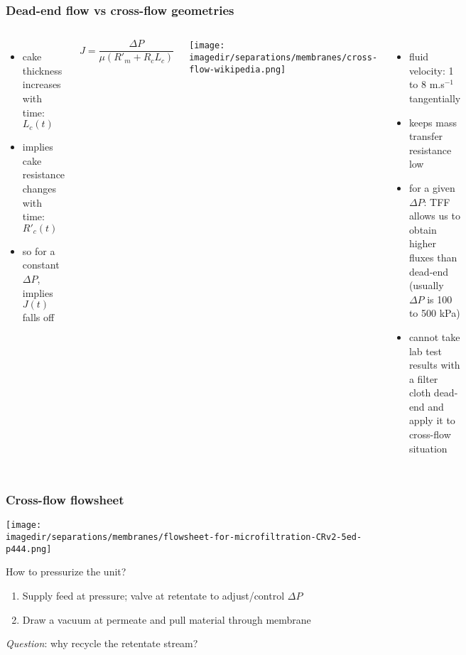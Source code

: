 \begin{frame}\frametitle{Dead-end flow vs cross-flow geometries}
	\begin{columns}[t]
			{\color{myBlue}{Dead-end flow}}
			\begin{itemize}
				\item	cake thickness increases with time: $L_c(t)$
				\item	implies cake resistance changes with time: $R'_c(t)$
				\item	so for a constant $\Delta P$, implies $J(t)$ falls off
			\end{itemize}
			\vspace{12pt}
			\begin{exampleblock}{}
					\[
						J = \dfrac{\Delta P}{\mu \left(R'_m + R_c L_c\right)}
					\]
			\end{exampleblock}
			{\color{myBlue}{Cross-flow (TFF)}}
			\begin{center}
				\texttt{[image: \\imagedir/separations/membranes/cross-flow-wikipedia.png]}
			\end{center}
			\vspace{-12pt}
			\begin{itemize}
				\item	fluid velocity: 1 to 8 m.s$^{-1}$ tangentially
				\item	keeps mass transfer resistance low
				\item	for a given $\Delta P$: TFF allows us to obtain higher fluxes than dead-end (usually $\Delta P$ is 100 to 500 kPa)
				\item	cannot take lab test results with a filter cloth dead-end and apply it to cross-flow situation
			\end{itemize}
	\end{columns}
\end{frame}

\begin{frame}\frametitle{Cross-flow flowsheet}
	\begin{center}
		\texttt{[image: \\imagedir/separations/membranes/flowsheet-for-microfiltration-CRv2-5ed-p444.png]}
	\end{center}
	\vspace{-16pt}
	
	
	How to pressurize the unit?
	\begin{enumerate}
		\item	\small Supply feed at pressure; valve at retentate to adjust/control $\Delta P$
		\item	Draw a vacuum at permeate and pull material through membrane
	\end{enumerate}
	\emph{Question}: why recycle the retentate stream? %
\end{frame}

